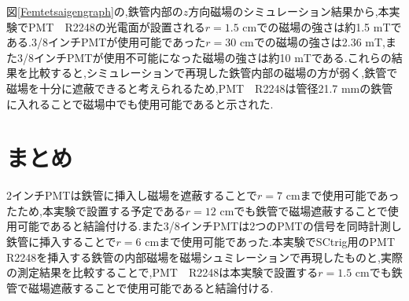 図\ref{Femtetsaigengraph}の,鉄管内部の$z$方向磁場のシミュレーション結果から,本実験でPMT　R2248の光電面が設置される$r=1.5$ cmでの磁場の強さは約1.5 mTである.3/8インチPMTが使用可能であった$r=30$ cmでの磁場の強さは2.36 mT,また3/8インチPMTが使用不可能になった磁場の強さは約10 mTである.これらの結果を比較すると,シミュレーションで再現した鉄管内部の磁場の方が弱く,鉄管で磁場を十分に遮蔽できると考えられるため,PMT　R2248は管径21.7 mmの鉄管に入れることで磁場中でも使用可能であると示された.

\section{まとめ}
2インチPMTは鉄管に挿入し磁場を遮蔽することで$r=7$ cmまで使用可能であったため,本実験で設置する予定である$r=12$ cmでも鉄管で磁場遮蔽することで使用可能であると結論付ける.また3/8インチPMTは2つのPMTの信号を同時計測し鉄管に挿入することで$r=6$ cmまで使用可能であった.本実験でSCtrig用のPMT　R2248を挿入する鉄管の内部磁場を磁場シュミレーションで再現したものと,実際の測定結果を比較することで,PMT　R2248は本実験で設置する$r=1.5$ cmでも鉄管で磁場遮蔽することで使用可能であると結論付ける.



